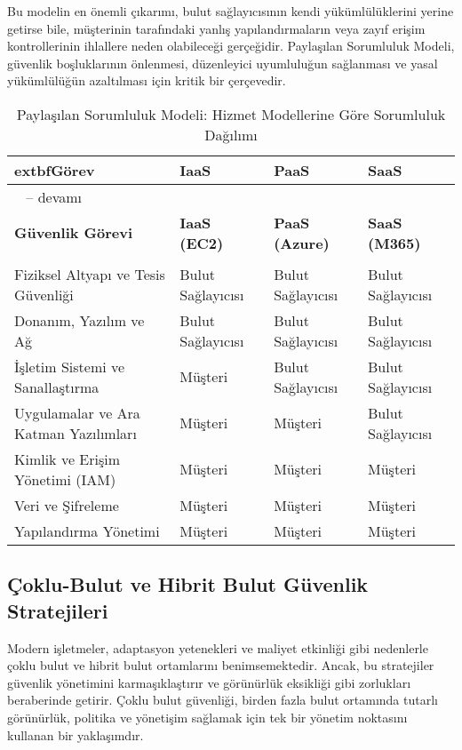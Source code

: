 Bu modelin en önemli çıkarımı, bulut sağlayıcısının kendi yükümlülüklerini yerine getirse bile, müşterinin tarafındaki yanlış yapılandırmaların veya zayıf erişim kontrollerinin ihlallere neden olabileceği gerçeğidir. Paylaşılan Sorumluluk Modeli, güvenlik boşluklarının önlenmesi, düzenleyici uyumluluğun sağlanması ve yasal yükümlülüğün azaltılması için kritik bir çerçevedir.

\begin{longtable}{|>{\scriptsize}p{1.1cm}|>{\scriptsize}p{1cm}|>{\scriptsize}p{1cm}|>{\scriptsize}p{1cm}|}
\caption{Paylaşılan Sorumluluk Modeli: Hizmet Modellerine Göre Sorumluluk Dağılımı}
\label{tab:shared_responsibility_model}\\
\hline
	extbf{Görev} & \textbf{IaaS} & \textbf{PaaS} & \textbf{SaaS}\\
\hline
\endfirsthead
\multicolumn{4}{c}%
{\tablename\ \thetable{} -- devamı}\\
\hline
\textbf{Güvenlik Görevi} & \textbf{IaaS (EC2)} & \textbf{PaaS (Azure)} & \textbf{SaaS (M365)}\\
\hline
\endhead
\hline
\multicolumn{4}{|r|}{Devamı bir sonraki sayfada}\\
\hline
\endfoot
\hline
\endlastfoot
Fiziksel Altyapı ve Tesis Güvenliği & Bulut Sağlayıcısı & Bulut Sağlayıcısı & Bulut Sağlayıcısı \\
\hline
Donanım, Yazılım ve Ağ & Bulut Sağlayıcısı & Bulut Sağlayıcısı & Bulut Sağlayıcısı \\
\hline
İşletim Sistemi ve Sanallaştırma & Müşteri & Bulut Sağlayıcısı & Bulut Sağlayıcısı \\
\hline
Uygulamalar ve Ara Katman Yazılımları & Müşteri & Müşteri & Bulut Sağlayıcısı \\
\hline
Kimlik ve Erişim Yönetimi (IAM) & Müşteri & Müşteri & Müşteri \\
\hline
Veri ve Şifreleme & Müşteri & Müşteri & Müşteri \\
\hline
Yapılandırma Yönetimi & Müşteri & Müşteri & Müşteri \\
\hline
\end{longtable}

\subsection{Çoklu-Bulut ve Hibrit Bulut Güvenlik Stratejileri}

Modern işletmeler, adaptasyon yetenekleri ve maliyet etkinliği gibi nedenlerle çoklu bulut ve hibrit bulut ortamlarını benimsemektedir. Ancak, bu stratejiler güvenlik yönetimini karmaşıklaştırır ve görünürlük eksikliği gibi zorlukları beraberinde getirir. Çoklu bulut güvenliği, birden fazla bulut ortamında tutarlı görünürlük, politika ve yönetişim sağlamak için tek bir yönetim noktasını kullanan bir yaklaşımdır.

